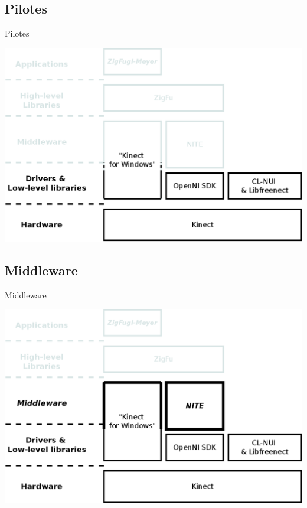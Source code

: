 
\subsection{Pilotes}
\begin{frame}{Pilotes}
\begin{center}
\includegraphics[width=0.9\linewidth]{../images/technology_overview_1}
\end{center}
\end{frame}

\subsection{Middleware}
\begin{frame}{Middleware}
\begin{center}
\includegraphics[width=0.9\linewidth]{../images/technology_overview_2}
\end{center}
\end{frame}

